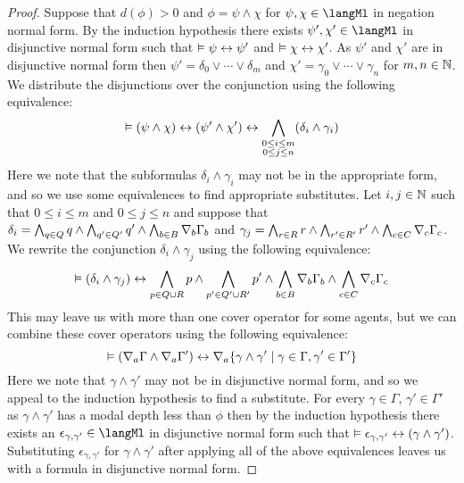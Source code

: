 \begin{proof}
Suppose that $d(\phi) > 0$ and $\phi = \psi \land \chi$ for $\psi, \chi \in \langMl$ in negation normal form.
By the induction hypothesis there exists $\psi', \chi' \in \langMl$ in disjunctive normal form such that $\vDash \psi \leftrightarrow \psi'$ and $\vDash \chi \leftrightarrow \chi'$.
As $\psi'$ and $\chi'$ are in disjunctive normal form then $\psi' = \delta_0 \lor \cdots \lor \delta_m$ and $\chi' = \gamma_0 \lor \cdots \lor \gamma_n$ for $m, n \in \mathbb{N}$.
We distribute the disjunctions over the conjunction using the following equivalence:
$$
\vDash (\psi \land \chi) \leftrightarrow (\psi' \land \chi') \leftrightarrow \bigwedge_{\substack{0 \leq i \leq m\\0 \leq j \leq n}} (\delta_i \land \gamma_i)
$$
Here we note that the subformulas $\delta_i \land \gamma_i$ may not be in the appropriate form, and so we use some equivalences to find appropriate substitutes. 
Let $i, j \in \mathbb{N}$ such that $0 \leq i \leq m$ and $0 \leq j \leq n$ and suppose that $\delta_i = \bigwedge_{q \in Q} q \land \bigwedge_{q' \in Q'} q' \land \bigwedge_{b \in B} \nabla_{b} \Gamma_b$ and $\gamma_j = \bigwedge_{r \in R} r \land \bigwedge_{r' \in R'} r' \land \bigwedge_{c \in C} \nabla_{c} \Gamma_c$.
We rewrite the conjunction $\delta_i \land \gamma_j$ using the following equivalence:
$$
\vDash (\delta_i \land \gamma_j) \leftrightarrow 
\bigwedge_{p \in Q \cup R} p \land \bigwedge_{p' \in Q' \cup R'} p' \land \bigwedge_{b \in B} \nabla_{b} \Gamma_b \land \bigwedge_{c \in C} \nabla_{c} \Gamma_c
$$
This may leave us with more than one cover operator for some agents, but we can combine these cover operators using the following equivalence:
$$
\vDash (\nabla_{a} \Gamma \land \nabla_{a} \Gamma') \leftrightarrow \nabla_{a} \{\gamma \land \gamma' \mid \gamma \in \Gamma, \gamma' \in \Gamma'\}
$$
Here we note that $\gamma \land \gamma'$ may not be in disjunctive normal form, and so we appeal to the induction hypothesis to find a substitute.
For every $\gamma \in \Gamma$, $\gamma' \in \Gamma'$ as $\gamma \land \gamma'$ has a modal depth less than $\phi$ then by the induction hypothesis there exists an $\epsilon_{\gamma,\gamma'} \in \langMl$ in disjunctive normal form such that $\vDash \epsilon_{\gamma,\gamma'} \leftrightarrow (\gamma \land \gamma')$.
Substituting $\epsilon_{\gamma,\gamma'}$ for $\gamma \land \gamma'$ after applying all of the above equivalences leaves us with a formula in disjunctive normal form.
\end{proof}

